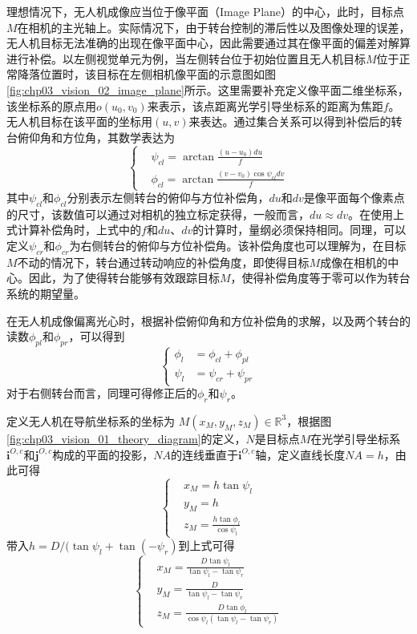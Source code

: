 理想情况下，无人机成像应当位于像平面（Image Plane）的中心，此时，目标点$M$在相机的主光轴上。实际情况下，由于转台控制的滞后性以及图像处理的误差，无人机目标无法准确的出现在像平面中心，因此需要通过其在像平面的偏差对解算进行补偿。以左侧视觉单元为例，当左侧转台位于初始位置且无人机目标$M$位于正常降落位置时，该目标在左侧相机像平面的示意图如图\ref{fig:chp03_vision_02_image_plane}所示。这里需要补充定义像平面二维坐标系，该坐标系的原点用$o(u_0, v_0)$来表示，该点距离光学引导坐标系的距离为焦距$f$。无人机目标在该平面的坐标用$(u,v)$来表达。通过集合关系可以得到补偿后的转台俯仰角和方位角，其数学表达为
\begin{equation} 
\left \{
\begin{split}
& \psi_{cl} = \arctan \frac{(u-u_0)du}{f} \\
& \phi_{cl} = \arctan \frac{(v-v_0)\cos\psi_{cl}dv}{f} 
\end{split}
\right.
\end{equation}
其中$\psi_{cl}$和$\phi_{cl}$分别表示左侧转台的俯仰与方位补偿角，$du$和$dv$是像平面每个像素点的尺寸，该数值可以通过对相机的独立标定获得，一般而言，$du \approx dv$。在使用上式计算补偿角时，上式中的$f$和$du$、$dv$的计算时，量纲必须保持相同。同理，可以定义$\psi_{cr}$和$\phi_{cr}$为右侧转台的俯仰与方位补偿角。该补偿角度也可以理解为，在目标$M$不动的情况下，转台通过转动响应的补偿角度，即使得目标$M$成像在相机的中心。因此，为了使得转台能够有效跟踪目标$M$，使得补偿角度等于零可以作为转台系统的期望量。

在无人机成像偏离光心时，根据补偿俯仰角和方位补偿角的求解，以及两个转台的读数$\phi_{pl}$和$\phi_{pr}$，可以得到
\begin{equation} 
\left \{
\begin{split}
\phi_l &= \phi_{cl} + \phi_{pl} \\ 
\psi_l &= \psi_{cr} + \psi_{pr}
\end{split}
\right.
\end{equation}
对于右侧转台而言，同理可得修正后的$\phi_r$和$\psi_r$。 

定义无人机在导航坐标系的坐标为 $M(x_M, y_M, z_M)\in \mathbb{R}^3 $，根据图\ref{fig:chp03_vision_01_theory_diagram}的定义，$N$是目标点$M$在光学引导坐标系$\mathbf{i}^{O,c}$和$\mathbf{j}^{O,c}$构成的平面的投影，$NA$的连线垂直于$\mathbf{i}^{O,c}$轴，定义直线长度$NA = h$，由此可得
\begin{equation}
\left \{
\begin{aligned}
&x_M = h \tan \psi_l  \\
&y_M = h \\
&z_M = \frac{h\tan \phi_l}{\cos \psi_l}
\end{aligned} \right.
\label{eq:M_Positon_Equation}
\end{equation}
带入$h=D/(\tan \psi_l + \tan (-\psi_r)$到上式可得
\begin{equation}
\left \{
\begin{aligned}
\label{eq:M_Position_Equation2}
&x_M =  \frac{D\tan \psi_l}{\tan \psi_l - \tan \psi_r}            \\
&y_M =  \frac{D}{\tan \psi_l - \tan \psi_r} \\
&z_M  = \frac{D\tan \phi_l}{\cos \psi_l(\tan \psi_l - \tan \psi_r)}
\end{aligned} \right. 
\end{equation}

